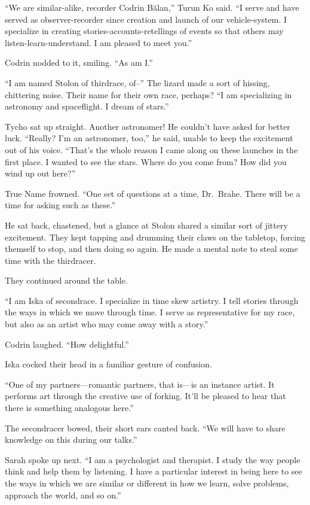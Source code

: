 ``We are similar-alike, recorder Codrin Bălan,'' Turun Ko said. ``I serve and have served as observer-recorder since creation and launch of our vehicle-system. I specialize in creating stories-accounts-retellings of events so that others may listen-learn-understand. I am pleased to meet you.''

Codrin nodded to it, smiling. ``As am I.''

``I am named Stolon of thirdrace, of--'' The lizard made a sort of hissing, chittering noise. Their name for their own race, perhaps? ``I am specializing in astronomy and spaceflight. I dream of stars.''

Tycho sat up straight. Another astronomer! He couldn't have asked for better luck. ``Really? I'm an astronomer, too,'' he said, unable to keep the excitement out of his voice. ``That's the whole reason I came along on these launches in the first place. I wanted to see the stars. Where do you come from? How did you wind up out here?''

True Name frowned. ``One set of questions at a time, Dr.~Brahe. There will be a time for asking such as these.''

He sat back, chastened, but a glance at Stolon shared a similar sort of jittery excitement. They kept tapping and drumming their claws on the tabletop, forcing themself to stop, and then doing so again. He made a mental note to steal some time with the thirdracer.

They continued around the table.

``I am Iska of secondrace. I specialize in time skew artistry. I tell stories through the ways in which we move through time. I serve as representative for my race, but also as an artist who may come away with a story.''

Codrin laughed. ``How delightful.''

Iska cocked their head in a familiar gesture of confusion.

``One of my partners—romantic partners, that is—is an instance artist. It performs art through the creative use of forking. It'll be pleased to hear that there is something analogous here.''

The secondracer bowed, their short ears canted back. ``We will have to share knowledge on this during our talks.''

Sarah spoke up next. ``I am a psychologist and therapist. I study the way people think and help them by listening. I have a particular interest in being here to see the ways in which we are similar or different in how we learn, solve problems, approach the world, and so on.''

